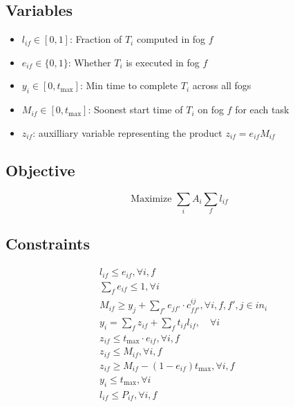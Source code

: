 \subsection{Variables}
\begin{itemize}
    \item $l_{if} \in [0,1]$: Fraction of $T_{i}$ computed in fog $f$
    \item $e_{if} \in \{0,1\}$: Whether $T_{i}$ is executed in fog $f$
    \item $y_{i} \in [0,t_{\max}]$: Min time to complete $T_i$ across all fogs
    \item $M_{if} \in [0,t_{\max}]$: Soonest start time of $T_i$ on fog $f$ for each task 
    \item $z_{if}$: auxilliary variable representing the product $z_{if}=e_{if} M_{if}$ 
\end{itemize}

\subsection*{Objective}
\begin{equation}
    \text{Maximize } \sum_i A_i \sum_f l_{if}  
\end{equation}
\subsection*{Constraints}

\begin{align}
    &l_{if} \leq e_{if}, \forall i, f \\ 
    &\sum_f e_{if} \leq 1, \forall i \\
    &M_{if} \geq y_j + \sum_{f'} e_{jf'} \cdot c_{ff'}^{ij}, \forall i, f, f', j \in in_i  \\
    &y_i = \sum_f z_{if} + \sum_f t_{if} l_{if} , \quad \forall i \\
    &z_{if} \leq t_{\max} \cdot e_{if}, \forall i,f\\
    &z_{if} \leq M_{if}, \forall i,f \\
    &z_{if} \geq M_{if} - (1 - e_{if}) t_{\max}, \forall i,f \\
    &y_i \leq t_{\max}, \forall i \\
    &l_{if} \leq P_{if}, \forall i,f 
\end{align}

